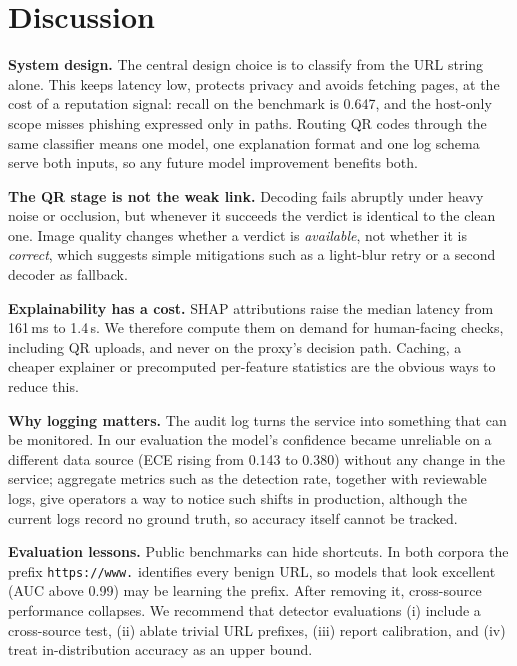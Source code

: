 \documentclass[conference]{IEEEtran}
\begin{document}
\section{Discussion}
\textbf{System design.} The central design choice is to classify from the URL string alone. This keeps latency low, protects privacy and avoids fetching pages, at the cost of a reputation signal: recall on the benchmark is 0.647, and the host-only scope misses phishing expressed only in paths. Routing QR codes through the same classifier means one model, one explanation format and one log schema serve both inputs, so any future model improvement benefits both.

\textbf{The QR stage is not the weak link.} Decoding fails abruptly under heavy noise or occlusion, but whenever it succeeds the verdict is identical to the clean one. Image quality changes whether a verdict is \emph{available}, not whether it is \emph{correct}, which suggests simple mitigations such as a light-blur retry or a second decoder as fallback.

\textbf{Explainability has a cost.} SHAP attributions raise the median latency from 161\,ms to 1.4\,s. We therefore compute them on demand for human-facing checks, including QR uploads, and never on the proxy's decision path. Caching, a cheaper explainer or precomputed per-feature statistics are the obvious ways to reduce this.

\textbf{Why logging matters.} The audit log turns the service into something that can be monitored. In our evaluation the model's confidence became unreliable on a different data source (ECE rising from 0.143 to 0.380) without any change in the service; aggregate metrics such as the detection rate, together with reviewable logs, give operators a way to notice such shifts in production, although the current logs record no ground truth, so accuracy itself cannot be tracked.

\textbf{Evaluation lessons.} Public benchmarks can hide shortcuts. In both corpora the prefix \texttt{https://www.} identifies every benign URL, so models that look excellent (AUC above 0.99) may be learning the prefix. After removing it, cross-source performance collapses. We recommend that detector evaluations (i) include a cross-source test, (ii) ablate trivial URL prefixes, (iii) report calibration, and (iv) treat in-distribution accuracy as an upper bound.
\end{document}

